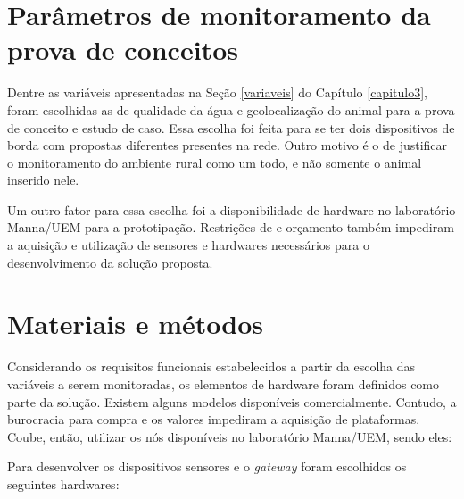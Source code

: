\documentclass[
    hidelinks,
	12pt,				%
	openany,
	oneside, 
	a4paper,			%
	english,			%
	french,				%
	spanish,			%
	brazil				%
	]{abntex2}
\begin{document}
\section{Parâmetros de monitoramento da prova de conceitos}

Dentre as variáveis apresentadas na Seção \ref{variaveis} do Capítulo \ref{capitulo3}, foram escolhidas as de qualidade da água e geolocalização do animal para a prova de conceito e estudo de caso. Essa escolha foi feita para se ter dois dispositivos de borda com propostas diferentes presentes na rede. Outro motivo é o de justificar o monitoramento do ambiente rural como um todo, e não somente o animal inserido nele. 

Um outro fator para essa escolha foi a disponibilidade de hardware no laboratório Manna/UEM para a prototipação. Restrições de e orçamento também impediram a aquisição e utilização de sensores e hardwares necessários para o desenvolvimento da solução proposta.

\section{Materiais e métodos}
Considerando os requisitos funcionais estabelecidos a partir da escolha das variáveis a serem monitoradas, os elementos de hardware foram definidos como parte da solução. Existem alguns modelos disponíveis comercialmente. Contudo, a burocracia para compra e os valores impediram a aquisição de plataformas. Coube, então, utilizar os nós disponíveis no laboratório Manna/UEM, sendo eles:


Para desenvolver os dispositivos sensores e o \textit{gateway} foram escolhidos os seguintes hardwares:
\end{document}
